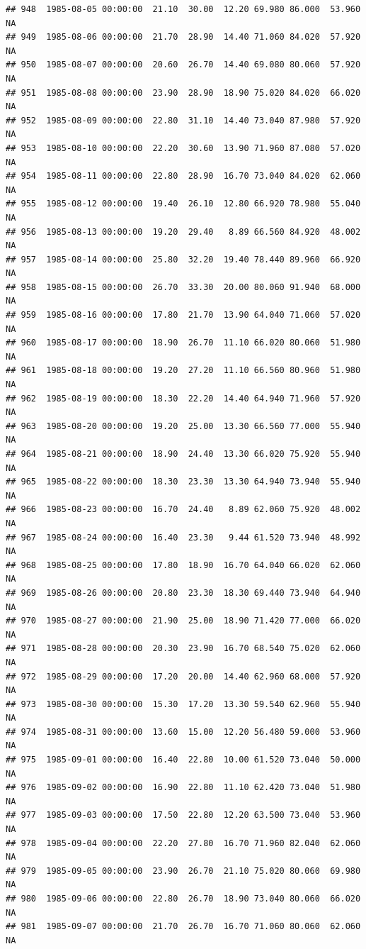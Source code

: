 \documentclass{article}\usepackage{graphicx, color}
\makeatletter
\newenvironment{kframe}{%
 \def\at@end@of@kframe{}%
 \ifinner\ifhmode%
  \def\at@end@of@kframe{\end{minipage}}%
  \begin{minipage}{\columnwidth}%
 \fi\fi%
 \def\FrameCommand##1{\hskip\@totalleftmargin \hskip-\fboxsep
 \colorbox{shadecolor}{##1}\hskip-\fboxsep
     \hskip-\linewidth \hskip-\@totalleftmargin \hskip\columnwidth}%
 \MakeFramed {\advance\hsize-\width
   \@totalleftmargin\z@ \linewidth\hsize
   \@setminipage}}%
 {\par\unskip\endMakeFramed%
 \at@end@of@kframe}
\newenvironment{knitrout}{}{} %
\makeatother
\begin{document}
\begin{knitrout}
\begin{kframe}
\begin{verbatim}
## 948  1985-08-05 00:00:00  21.10  30.00  12.20 69.980 86.000  53.960     NA
## 949  1985-08-06 00:00:00  21.70  28.90  14.40 71.060 84.020  57.920     NA
## 950  1985-08-07 00:00:00  20.60  26.70  14.40 69.080 80.060  57.920     NA
## 951  1985-08-08 00:00:00  23.90  28.90  18.90 75.020 84.020  66.020     NA
## 952  1985-08-09 00:00:00  22.80  31.10  14.40 73.040 87.980  57.920     NA
## 953  1985-08-10 00:00:00  22.20  30.60  13.90 71.960 87.080  57.020     NA
## 954  1985-08-11 00:00:00  22.80  28.90  16.70 73.040 84.020  62.060     NA
## 955  1985-08-12 00:00:00  19.40  26.10  12.80 66.920 78.980  55.040     NA
## 956  1985-08-13 00:00:00  19.20  29.40   8.89 66.560 84.920  48.002     NA
## 957  1985-08-14 00:00:00  25.80  32.20  19.40 78.440 89.960  66.920     NA
## 958  1985-08-15 00:00:00  26.70  33.30  20.00 80.060 91.940  68.000     NA
## 959  1985-08-16 00:00:00  17.80  21.70  13.90 64.040 71.060  57.020     NA
## 960  1985-08-17 00:00:00  18.90  26.70  11.10 66.020 80.060  51.980     NA
## 961  1985-08-18 00:00:00  19.20  27.20  11.10 66.560 80.960  51.980     NA
## 962  1985-08-19 00:00:00  18.30  22.20  14.40 64.940 71.960  57.920     NA
## 963  1985-08-20 00:00:00  19.20  25.00  13.30 66.560 77.000  55.940     NA
## 964  1985-08-21 00:00:00  18.90  24.40  13.30 66.020 75.920  55.940     NA
## 965  1985-08-22 00:00:00  18.30  23.30  13.30 64.940 73.940  55.940     NA
## 966  1985-08-23 00:00:00  16.70  24.40   8.89 62.060 75.920  48.002     NA
## 967  1985-08-24 00:00:00  16.40  23.30   9.44 61.520 73.940  48.992     NA
## 968  1985-08-25 00:00:00  17.80  18.90  16.70 64.040 66.020  62.060     NA
## 969  1985-08-26 00:00:00  20.80  23.30  18.30 69.440 73.940  64.940     NA
## 970  1985-08-27 00:00:00  21.90  25.00  18.90 71.420 77.000  66.020     NA
## 971  1985-08-28 00:00:00  20.30  23.90  16.70 68.540 75.020  62.060     NA
## 972  1985-08-29 00:00:00  17.20  20.00  14.40 62.960 68.000  57.920     NA
## 973  1985-08-30 00:00:00  15.30  17.20  13.30 59.540 62.960  55.940     NA
## 974  1985-08-31 00:00:00  13.60  15.00  12.20 56.480 59.000  53.960     NA
## 975  1985-09-01 00:00:00  16.40  22.80  10.00 61.520 73.040  50.000     NA
## 976  1985-09-02 00:00:00  16.90  22.80  11.10 62.420 73.040  51.980     NA
## 977  1985-09-03 00:00:00  17.50  22.80  12.20 63.500 73.040  53.960     NA
## 978  1985-09-04 00:00:00  22.20  27.80  16.70 71.960 82.040  62.060     NA
## 979  1985-09-05 00:00:00  23.90  26.70  21.10 75.020 80.060  69.980     NA
## 980  1985-09-06 00:00:00  22.80  26.70  18.90 73.040 80.060  66.020     NA
## 981  1985-09-07 00:00:00  21.70  26.70  16.70 71.060 80.060  62.060     NA

\end{verbatim}
\end{kframe}
\end{knitrout}
\end{document}
